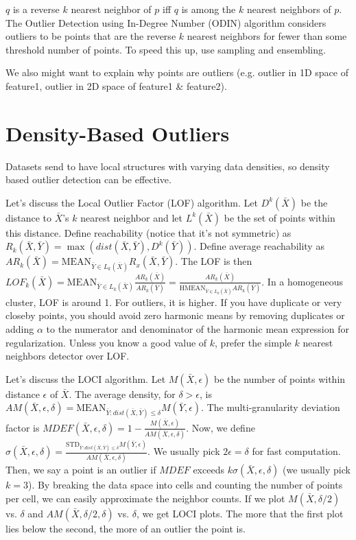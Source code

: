\documentclass[a4paper]{article}
\begin{document}
$q$ is a reverse $k$ nearest neighbor of $p$ iff $q$ is among the $k$
nearest neighbors of $p$. The Outlier Detection using In-Degree Number (ODIN)
algorithm considers outliers to be points that are the reverse $k$ nearest
neighbors for fewer than some threshold number of points. To speed this up,
use sampling and ensembling.

We also might want to explain why points are outliers (e.g. outlier in
1D space of feature1, outlier in 2D space of feature1 & feature2).

\section{Density-Based Outliers}
Datasets send to have local structures with varying data densities, so density
based outlier detection can be effective.

Let's discuss the Local Outlier Factor (LOF) algorithm. Let $D^k(\bar{X})$ be
the distance to $\bar{X}$'s $k$ nearest neighbor and let $L^k(\bar{X})$ be the
set of points within this distance. Define reachability (notice that it's
not symmetric) as
$R_k(\bar{X}, \bar{Y}) = \max{(dist(\bar{X}, \bar{Y}), D^k(\bar{Y}))}$. Define
average reachability as $AR_k(\bar{X}) =
\textrm{MEAN}_{\bar{Y} \in L_k(\bar{X})} R_x(\bar{X}, \bar{Y})$. The LOF is then
$LOF_k(\bar{X}) = \textrm{MEAN}_{\bar{Y} \in L_k(\bar{X})} \frac{AR_k(\bar{X})}{
AR_k(\bar{Y})} = \frac{AR_k(\bar{X})}{\textrm{HMEAN}_{\bar{Y} \in L_k(\bar{X})} AR_k(\bar{Y})}$.
In a homogeneous cluster, LOF is around 1. For outliers, it is higher. If you
have duplicate or very closeby points, you should avoid zero harmonic means by
removing duplicates or adding $\alpha$ to the numerator and denominator of the
harmonic mean expression for regularization. Unless you know a good value of
$k$, prefer the simple $k$ nearest neighbors detector over LOF.

Let's discuss the LOCI algorithm. Let $M(\bar{X}, \epsilon)$ be the number of
points within distance $\epsilon$ of $\bar{X}$. The average density, for $\delta
> \epsilon$, is $AM(\bar{X}, \epsilon, \delta) = \textrm{MEAN}_{\bar{Y}:
dist(\bar{X}, \bar{Y})\leq \delta} M(\bar{Y}, \epsilon)$. The multi-granularity
deviation factor is $MDEF(\bar{X}, \epsilon, \delta) = 1 -
\frac{M(\bar{X}, \epsilon)}{AM(\bar{X}, \epsilon, \delta)}$. Now, we define
$\sigma(\bar{X}, \epsilon, \delta) = \frac{\textrm{STD}_{\bar{Y}:
dist(\bar{X}, \bar{Y})\leq \delta} M(\bar{Y}, \epsilon)}{AM(\bar{X}, \epsilon,
\delta)}$. We usually pick $2 \epsilon = \delta$ for fast computation. Then,
we say a point is an outlier if $MDEF$ exceeds $k \sigma(\bar{X}, \epsilon, \delta)$
(we usually pick $k = 3$). By breaking the data space into cells and counting
the number of points per cell, we can easily approximate the neighbor counts.
If we plot $M(\bar{X}, \delta / 2)$ vs. $\delta$ and
$AM(\bar{X}, \delta / 2, \delta)$ vs. $\delta$, we get LOCI plots. The more
that the first plot lies below the second, the more of an outlier the point
is.
\end{document}

